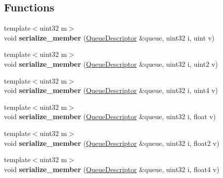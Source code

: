 \subsection*{Functions}
\begin{DoxyCompactItemize}
\item 
\mbox{\label{group___wavefront_queues_ga5f9120126d0abccf43b9bbfbdcb98de5}} 
{\footnotesize template$<$uint32 m$>$ }\\void {\bfseries serialize\+\_\+member} (\hyperlink{struct_queue_descriptor}{Queue\+Descriptor} \&queue, uint32 i, uint v)
\item 
\mbox{\label{group___wavefront_queues_ga8df3f1db369268f60efc3897efa2a5f1}} 
{\footnotesize template$<$uint32 m$>$ }\\void {\bfseries serialize\+\_\+member} (\hyperlink{struct_queue_descriptor}{Queue\+Descriptor} \&queue, uint32 i, uint2 v)
\item 
\mbox{\label{group___wavefront_queues_ga8d7113d99299c2db875d537336de9b15}} 
{\footnotesize template$<$uint32 m$>$ }\\void {\bfseries serialize\+\_\+member} (\hyperlink{struct_queue_descriptor}{Queue\+Descriptor} \&queue, uint32 i, uint4 v)
\item 
\mbox{\label{group___wavefront_queues_ga1dc7a40cd39e2ff6557b7dadd9a0a7b8}} 
{\footnotesize template$<$uint32 m$>$ }\\void {\bfseries serialize\+\_\+member} (\hyperlink{struct_queue_descriptor}{Queue\+Descriptor} \&queue, uint32 i, float v)
\item 
\mbox{\label{group___wavefront_queues_ga02f872315fdde5cae00168917c11cdba}} 
{\footnotesize template$<$uint32 m$>$ }\\void {\bfseries serialize\+\_\+member} (\hyperlink{struct_queue_descriptor}{Queue\+Descriptor} \&queue, uint32 i, float2 v)
\item 
\mbox{\label{group___wavefront_queues_gaca910999b2e1ca3d85ce0c447ed84727}} 
{\footnotesize template$<$uint32 m$>$ }\\void {\bfseries serialize\+\_\+member} (\hyperlink{struct_queue_descriptor}{Queue\+Descriptor} \&queue, uint32 i, float4 v)

\end{DoxyCompactItemize}
